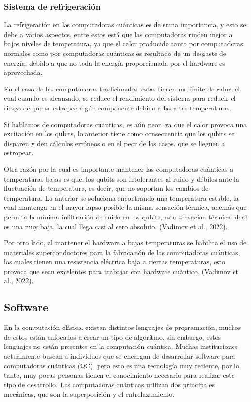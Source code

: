 \documentclass{article}
\begin{document}
\subsubsection{Sistema de refrigeración}
La refrigeración en las computadoras cuánticas es de suma importancia, y esto se debe a varios aspectos, entre estos está que las computadoras rinden mejor a bajos niveles de temperatura, ya que el calor producido tanto por computadoras normales como por computadoras cuánticas es resultado de un desgaste de energía, debido a que no toda la energía proporcionada por el hardware es aprovechada.
 
En el caso de las computadoras tradicionales, estas tienen un límite de calor, el cual cuando es alcanzado, se reduce el rendimiento del sistema para reducir el riesgo de que se estropee algún componente debido a las altas temperaturas.

 Si hablamos de computadoras cuánticas, es aún peor, ya que el calor provoca una excitación en los qubits, lo anterior tiene como consecuencia que los qubits se disparen y den cálculos erróneos o en el peor de los casos, que se lleguen a estropear. 

Otra razón por la cual es importante mantener las computadoras cuánticas a temperaturas bajas es que, los qubits son intolerantes al ruido y débiles ante la fluctuación de temperatura, es decir, que no soportan los cambios de temperatura. Lo anterior se soluciona encontrando una temperatura estable, la cual mantenga en el mayor lapso posible la misma sensación térmica, además que permita la mínima infiltración de ruido en los qubits, esta sensación térmica ideal es una muy baja, la cual llega casi al cero absoluto. (Vadimov et al., 2022).

Por otro lado, al mantener el hardware a bajas temperaturas se habilita el uso de materiales superconductores para la fabricación de las computadoras cuánticas, los cuales tienen una resistencia eléctrica baja a ciertas temperaturas, esto provoca que sean excelentes para trabajar con hardware cuántico. (Vadimov et al., 2022).


\subsection{Software}
En la computación clásica, existen distintos lenguajes de programación, muchos de estos están enfocados a crear un tipo de algorítmo, sin embargo, estos lenguajes no están presentes en la computación cuántica. Muchas instituciones actualmente buscan a individuos que se encargan de desarrollar software para computadoras cuánticas (QC), pero esto es una tecnología muy reciente, por lo tanto, muy pocas personas tienen el conocimiento necesario para realizar este tipo de desarrollo. Las computadoras cuánticas utilizan dos principales mecánicas, que son la superposición y el entrelazamiento. 
\end{document}
